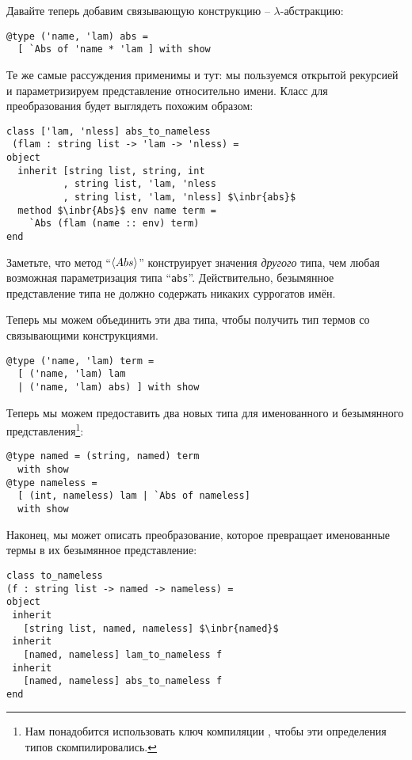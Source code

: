 Давайте теперь добавим связывающую конструкцию -- $\lambda$-абстракцию:

\begin{lstlisting}
@type ('name, 'lam) abs = 
  [ `Abs of 'name * 'lam ] with show
\end{lstlisting}

Те же самые рассуждения применимы и тут: мы пользуемся открытой рекурсией и параметризируем представление относительно имени.
Класс для преобразования будет выглядеть похожим образом:

\begin{lstlisting}
class ['lam, 'nless] abs_to_nameless
 (flam : string list -> 'lam -> 'nless) =
object
  inherit [string list, string, int
          , string list, 'lam, 'nless
          , string list, 'lam, 'nless] $\inbr{abs}$
  method $\inbr{Abs}$ env name term = 
    `Abs (flam (name :: env) term)
end
\end{lstlisting}

Заметьте, что метод ``$\left<Abs\right>$'' конструирует значения \emph{другого} типа, чем любая возможная параметризация типа ``\lstinline{abs}''. Действительно, безымянное представление типа не должно содержать никаких суррогатов имён.

Теперь мы можем объединить эти два типа, чтобы получить тип термов со связывающими конструкциями.

\begin{lstlisting}
@type ('name, 'lam) term = 
  [ ('name, 'lam) lam 
  | ('name, 'lam) abs) ] with show
\end{lstlisting}

Теперь мы можем предоставить два новых типа для именованного и безымянного представления\footnote{Нам понадобится использовать ключ компиляции
, чтобы эти определения типов скомпилировались.}:

\begin{lstlisting}
@type named = (string, named) term 
  with show
@type nameless = 
  [ (int, nameless) lam | `Abs of nameless] 
  with show
\end{lstlisting}

Наконец, мы может описать преобразование, которое превращает именованные термы в их безымянное представление:

\begin{lstlisting}
class to_nameless
(f : string list -> named -> nameless) = 
object
 inherit 
   [string list, named, nameless] $\inbr{named}$
 inherit 
   [named, nameless] lam_to_nameless f
 inherit 
   [named, nameless] abs_to_nameless f
end
\end{lstlisting}

